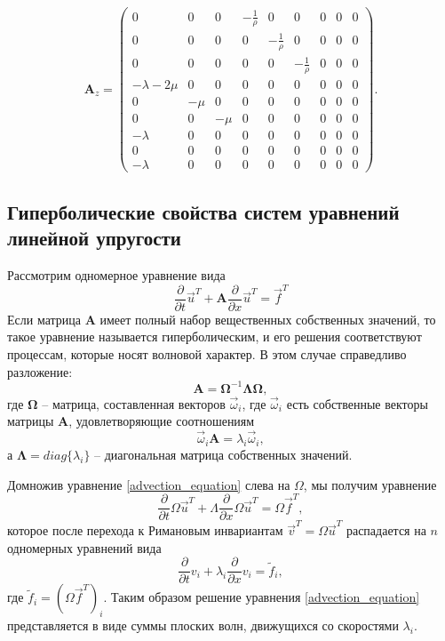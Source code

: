 \begin{displaymath}
\mathbf{A}_z =
\left( \begin{array}{cccccccccccc}
0 & 0 & 0 & -\frac 1 \rho & 0 & 0 & 0 & 0 & 0 \\ 
0 & 0 & 0 & 0 & -\frac 1 \rho & 0 & 0 & 0 & 0 \\ 
0 & 0 & 0 & 0 & 0 & -\frac 1 \rho & 0 & 0 & 0 \\ 
-\lambda-2\mu & 0 & 0 & 0 & 0 & 0 & 0 & 0 & 0 \\ 
0 & -\mu & 0 & 0 & 0 & 0 & 0 & 0 & 0 \\ 
0 & 0 & -\mu & 0 & 0 & 0 & 0 & 0 & 0 \\ 
-\lambda & 0 & 0 & 0 & 0 & 0 & 0 & 0 & 0 \\ 
0 & 0 & 0 & 0 & 0 & 0 & 0 & 0 & 0 \\ 
-\lambda & 0 & 0 & 0 & 0 & 0 & 0 & 0 & 0  
\end{array} \right).
\end{displaymath}
\subsection{Гиперболические свойства систем уравнений линейной упругости}
Рассмотрим одномерное уравнение вида
\begin{equation}
\frac{\partial}{\partial{t}}\vec{u}^T+\mathbf{A}\frac{\partial}{\partial{x}}\vec{u}^T=\vec{f}^T
\label{advection_equation}
\end{equation}
Если матрица $\mathbf{A}$ имеет полный набор вещественных собственных значений, 
то такое уравнение называется гиперболическим, и его решения соответствуют 
процессам, которые носят волновой характер. В этом случае справедливо разложение:
$$\mathbf{A}=\mathbf\Omega^{-1}\mathbf\Lambda\mathbf\Omega,$$
где $\mathbf\Omega$ -- матрица, составленная векторов ${\vec\omega_i}$, где
$\vec\omega_i$ есть собственные векторы матрицы $\mathbf A$,
удовлетворяющие соотношениям
$$\vec\omega_i\mathbf A=\lambda_i\vec\omega_i,$$
а $\mathbf\Lambda=diag\{\lambda_i\}$ -- диагональная матрица собственных
значений.

Домножив уравнение \ref{advection_equation} слева на $\Omega$, мы получим
уравнение
$$\frac{\partial}{\partial t}\Omega{\vec u}^T+
\Lambda\frac{\partial}{\partial x}\Omega{\vec u}^T=\Omega{\vec f}^T,$$
которое после перехода к Римановым инвариантам ${\vec v}^T=\Omega{\vec u}^T$
распадается на $n$ одномерных уравнений вида
\begin{equation}
\frac{\partial}{\partial t}{v_i}+\lambda_i\frac{\partial}{\partial
x}{v_i}={{\tilde f}_i},
\label{advection_equation_splitted}
\end{equation}
где ${{\tilde f}_i}=(\Omega{\vec f}^T)_i$.
Таким образом решение уравнения \ref{advection_equation} представляется в виде
суммы плоских волн, движущихся со скоростями $\lambda_i$.
